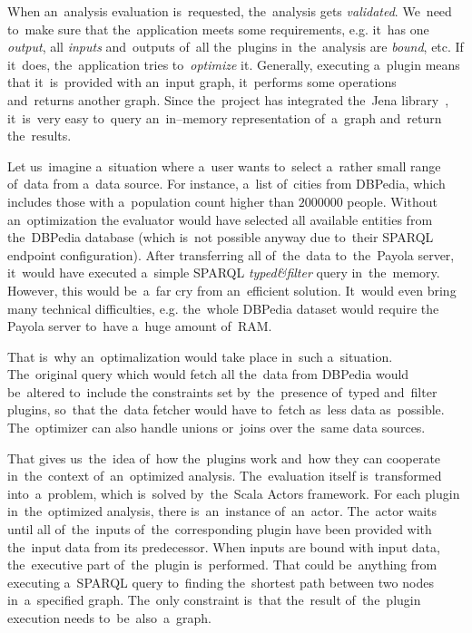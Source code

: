 When an~analysis evaluation is~requested, the~analysis gets \emph{validated}. We~need to~make
sure that the~application meets some requirements, e.g. it~has one 
\emph{output}, all \emph{inputs} and~outputs of~all the~plugins in~the~analysis are \emph{bound}, etc.
If it~does, the~application tries to~\emph{optimize} it. Generally, executing a~plugin 
means that it~is~provided with an~input graph, it~performs some operations and~returns another graph. Since the~project has integrated the~Jena library~\cite{jena}, it~is~very easy to~query an~in--memory representation of~a~graph and~return the~results.

Let us~imagine a~situation where a~user wants to~select a~rather small range of~data from a~data source. For instance, a~list of~cities from DBPedia, which includes those
with a~population count higher than $2000000$ people. Without an~optimization
the evaluator would have selected all available entities from the~DBPedia 
database (which is~not possible anyway due to~their SPARQL endpoint 
configuration). After transferring all of~the~data to~the~Payola server, it~would have
executed a~simple SPARQL \emph{typed\&filter} query in~the~memory.
However, this would be~a~far cry from an~efficient solution. It~would even
bring many technical difficulties, e.g. the~whole DBPedia dataset would require 
the Payola server to~have a~huge amount of~RAM.

That is~why an~optimalization would take place in~such a~situation. The~original 
query which would fetch all the~data from DBPedia would be~altered to~include 
the constraints set by~the~presence of~typed and~filter plugins, so~that the~data fetcher would have to~fetch as~less data as~possible. The~optimizer can 
also handle unions or~joins over the~same data sources.

That gives us~the~idea of~how the~plugins work and~how they can cooperate in~the~context
of~an~optimized analysis. The~evaluation itself is~transformed 
into~a~problem, which is~solved by~the~Scala Actors framework. For each plugin 
in~the~optimized analysis, there is~an~instance of~an~actor. The~actor waits 
until all of~the~inputs of~the~corresponding plugin have been provided with the~input data from its predecessor. When inputs are bound with input data, the~executive part of~the~plugin is~performed. That could be~anything from 
executing a~SPARQL query to~finding the~shortest path between two nodes in~a~specified graph. The~only constraint is~that the~result of~the~plugin execution 
needs to~be~also~a~graph.

